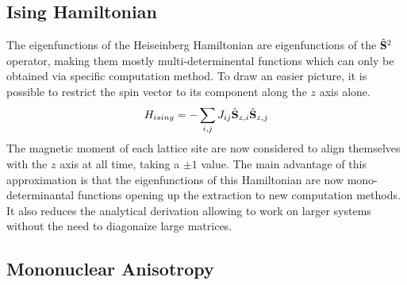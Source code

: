 \documentclass[10pt]{report}
\numberwithin{equation}{section}
\begin{document}
\subsection*{Ising Hamiltonian}

The eigenfunctions of the Heiseinberg Hamiltonian are eigenfunctions of the $\hat{\vb S}^2$ operator, making them mostly multi-determinental functions which can only be obtained via specific computation method.
To draw an easier picture, it is possible to restrict the spin vector to its component along the $z$ axis alone.
\begin{equation}
    H_{ising}=- \sum_{i,j} J_{ij} \hat{\vb S}_{z,i} \hat{\vb S}_{z,j}
\end{equation}
The magnetic moment of each lattice site are now considered to align themselves with the $z$ axis at all time, taking a $\pm 1$ value.
The main advantage of this approximation is that the eigenfunctions of this Hamiltonian are now mono-determinantal functions opening up the extraction to new computation methods. 
It also reduces the analytical derivation allowing to work on larger systems without the need to diagonaize large matrices.

\subsection{Mononuclear Anisotropy}
\end{document}
